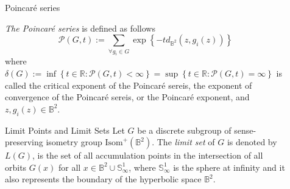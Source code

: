 \documentclass[final]{beamer}
\newlength{\sepwid}
\newlength{\onecolwid}
\begin{document}
\begin{frame}[t]
\begin{columns}[t]
\begin{column}{\onecolwid}
\begin{block}{Poincar\'{e} series}

\begin{footnotesize}
\textit{The Poincar\'{e} series} is defined as follows
$$
\mathcal{P}(G,t):=\sum\limits_{\forall g_i\in G}\exp\left\lbrace -td_{\mathbb{B}^2}(z,g_i(z)) \right\rbrace
$$
where $\delta(G):=\inf\left\lbrace t\in\mathbb{R}:\mathcal{P}(G,t)<\infty \right\rbrace = \sup\left\lbrace t\in\mathbb{R}:\mathcal{P}(G,t)=\infty\right\rbrace$ is called the critical exponent of the Poincar\'{e} sereis, the exponent of convergence of the Poincar\'{e} sereis, or the Poincar\'{e} exponent, and $z,g_i(z)\in \mathbb{B}^2$. 
\end{footnotesize}


\end{block}

\begin{footnotesize}
\begin{block}{Limit Points and Limit Sets}
Let $G$ be a discrete subgroup of sense-preserving isometry group $\text{Isom}^+(\mathbb{B}^{2})$. The \textit{limit set} of $G$ is denoted by $L(G)$, is the set of all accumulation points in the intersection of all orbits $G(x)$ for all $x\in \mathbb{B}^2\cup \mathbb{S}^{1}_\infty$, where $\mathbb{S}^{1}_\infty$ is the sphere at infinity and it also represents the boundary of the hyperbolic space $\mathbb{B}^{2}$\cite{ahlfors1981mobius}.
\end{block}
\end{footnotesize}

\end{column}	











\begin{column}{\sepwid}\end{column}%

\begin{column}{\onecolwid}	



\end{column}
\end{columns}
\end{frame}
\end{document}
